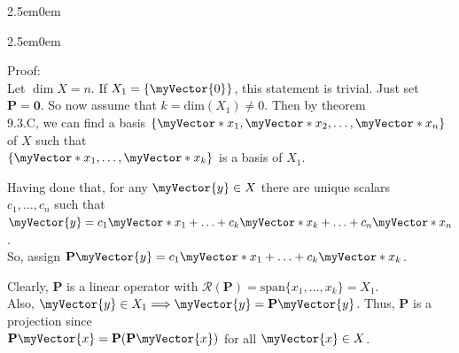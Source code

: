 \documentclass{book}
\newcommand{\hThree}{%
   \color{PineGreen!85!Orange}
   \fontsize{13}{15}\selectfont%
}
\newenvironment{myIndent}{%
   \begin{adjustwidth}{2.5em}{0em}%
}{%
   \end{adjustwidth}%
}
\newcommand{\mySpan}{\mathrm{span}}
\newcommand{\myDim}[1]{\mathrm{dim}(#1)}
\newcommand{\rangeSp}[1]{\mathscr{R}(#1)}
\newcommand{\retTwo}{\hfill\bigbreak}
\newcommand{\mVec}[1]{\myVector{#1}}
\newcommand{\mVecAst}[1]{\myVector*{#1}}
\newcommand{\mMat}[1]{\mathbf{#1}}
\begin{document}
{\begin{myIndent}
\begin{itemize}
      {\begin{myIndent}\hThree
         Proof:\\
         Let $\dim{X} = n$. If $X_1 = \{\mVec{0}\}$, this statement is trivial. Just set\\ $\mMat{P} = \mMat{0}$. So now assume that $k = \myDim{X_1} \neq 0$. Then by theorem\\ 9.3.C, we can find a basis $\{\mVecAst{x}_1, \mVecAst{x}_2, \ldots, \mVecAst{x}_n\}$ of $X$ such that\\ $\{\mVecAst{x}_1, \ldots, \mVecAst{x}_k\}$ is a basis of $X_1$.\retTwo

         Having done that, for any $\mVec{y} \in X$ there are unique scalars\\ $c_1, \ldots, c_n$ such that $\mVec{y} = c_1\mVecAst{x}_1 + \ldots + c_k\mVecAst{x}_k + \ldots + c_n\mVecAst{x}_n$.\\ So, assign $\mMat{P}\mVec{y} = c_1\mVecAst{x}_1 + \ldots + c_k\mVecAst{x}_k$.\retTwo
         
         Clearly, $\mMat{P}$ is a linear operator with $\rangeSp{\mMat{P}} = \mySpan \{x_1, \ldots, x_k\} = X_1$.\\ Also, $\mVec{y} \in X_1 \Longrightarrow \mVec{y} = \mMat{P}\mVec{y}$. Thus, $\mMat{P}$ is  a projection since\\ $\mMat{P}\mVec{x} = \mMat{P}(\mMat{P}\mVec{x})$ for all $\mVec{x} \in X$.\retTwo
      \end{myIndent}}
   \end{itemize}
\end{myIndent}}
\end{document}
